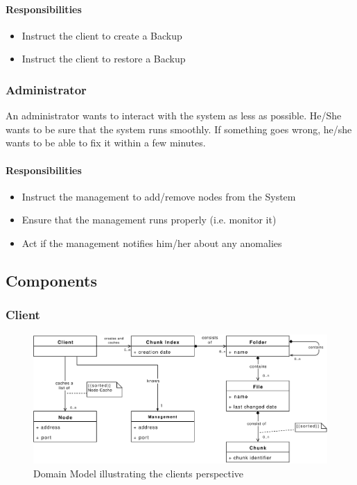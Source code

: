 \paragraph{Responsibilities}
\begin{itemize}
    \item Instruct the \gls{client} to create a Backup
    \item Instruct the \gls{client} to restore a Backup
\end{itemize}


\subsubsection{Administrator}
An \gls{administrator} wants to interact with the system as less as possible. He/She wants to be sure that the \gls{system} runs smoothly. If something goes wrong, he/she wants to be able to fix it within a few minutes.

\paragraph{Responsibilities}
\begin{itemize}
    \item Instruct the \gls{management} to add/remove \glspl{node} from the System
    \item Ensure that the \gls{management} runs properly (i.e. monitor it)
    \item Act if the \gls{management} notifies him/her about any anomalies
\end{itemize}

\subsection{Components}

\subsubsection{Client}
\label{sec:component-client}

\begin{figure}[h]
    \centering
    \includegraphics[width=1\linewidth]{resources/client_domain_model}
    \caption[Client Domain Model]{Domain Model illustrating the \glspl{client} perspective}
\end{figure}

